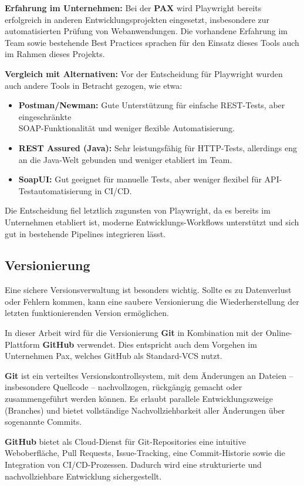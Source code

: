 \textbf{Erfahrung im Unternehmen:} Bei der \textbf{PAX} wird Playwright bereits erfolgreich in anderen Entwicklungsprojekten eingesetzt, insbesondere zur automatisierten Prüfung von Webanwendungen. Die vorhandene Erfahrung im Team sowie bestehende Best Practices sprachen für den Einsatz dieses Tools auch im Rahmen dieses Projekts.

\textbf{Vergleich mit Alternativen:} Vor der Entscheidung für Playwright wurden auch andere Tools in Betracht gezogen, wie etwa:
\begin{itemize}
  \item \textbf{Postman/Newman:} Gute Unterstützung für einfache REST-Tests, aber eingeschränkte \\ SOAP-Funktionalität und weniger flexible Automatisierung.
  \item \textbf{REST Assured (Java):} Sehr leistungsfähig für HTTP-Tests, allerdings eng an die Java-Welt gebunden und weniger etabliert im Team.
  \item \textbf{SoapUI:} Gut geeignet für manuelle Tests, aber weniger flexibel für API-Testautomatisierung in CI/CD.
\end{itemize}

Die Entscheidung fiel letztlich zugunsten von Playwright, da es bereits im Unternehmen etabliert ist, moderne Entwicklungs-Workflows unterstützt und sich gut in bestehende Pipelines integrieren lässt.


\subsection{Versionierung}
Eine sichere Versionsverwaltung ist besonders wichtig. Sollte es zu Datenverlust oder Fehlern kommen, kann eine saubere Versionierung die Wiederherstellung der letzten funktionierenden Version ermöglichen.

In dieser Arbeit wird für die Versionierung \textbf{Git} in Kombination mit der Online-Plattform \textbf{GitHub} verwendet. Dies entspricht auch dem Vorgehen im Unternehmen Pax, welches GitHub als Standard-VCS nutzt.

\textbf{Git} ist ein verteiltes Versionskontrollsystem, mit dem Änderungen an Dateien – insbesondere Quellcode – nachvollzogen, rückgängig gemacht oder zusammengeführt werden können. Es erlaubt parallele Entwicklungszweige (Branches) und bietet vollständige Nachvollziehbarkeit aller Änderungen über sogenannte Commits.

\textbf{GitHub} bietet als Cloud-Dienst für Git-Repositories eine intuitive Weboberfläche, Pull Requests, Issue-Tracking, eine Commit-Historie sowie die Integration von CI/CD-Prozessen. Dadurch wird eine strukturierte und nachvollziehbare Entwicklung sichergestellt.


